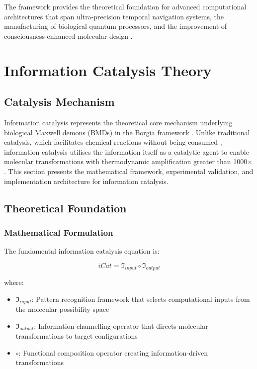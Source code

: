 \documentclass[12pt,a4paper]{article}
\begin{document}
The framework provides the theoretical foundation for advanced computational architectures that span ultra-precision temporal navigation systems, the manufacturing of biological quantum processors, and the improvement of consciousness-enhanced molecular design \cite{ball2011physics}.

\section{Information Catalysis Theory}

\subsection{Catalysis Mechanism}

Information catalysis represents the theoretical core mechanism underlying biological Maxwell demons (BMDs) in the Borgia framework \cite{mizraji2007biological}. Unlike traditional catalysis, which facilitates chemical reactions without being consumed \cite{atkins2010physical}, information catalysis utilises the information itself as a catalytic agent to enable molecular transformations with thermodynamic amplification greater than 1000× \cite{landauer1961irreversibility}. This section presents the mathematical framework, experimental validation, and implementation architecture for information catalysis.

\subsection{Theoretical Foundation}

\subsubsection{Mathematical Formulation}

The fundamental information catalysis equation is:

\begin{equation}
iCat = \mathfrak{I}_{input} \circ \mathfrak{I}_{output}
\end{equation}

where:
\begin{itemize}
\item $\mathfrak{I}_{input}$: Pattern recognition framework that selects computational inputs from the molecular possibility space
\item $\mathfrak{I}_{output}$: Information channelling operator that directs molecular transformations to target configurations  
\item $\circ$: Functional composition operator creating information-driven transformations
\end{itemize}
\end{document}
